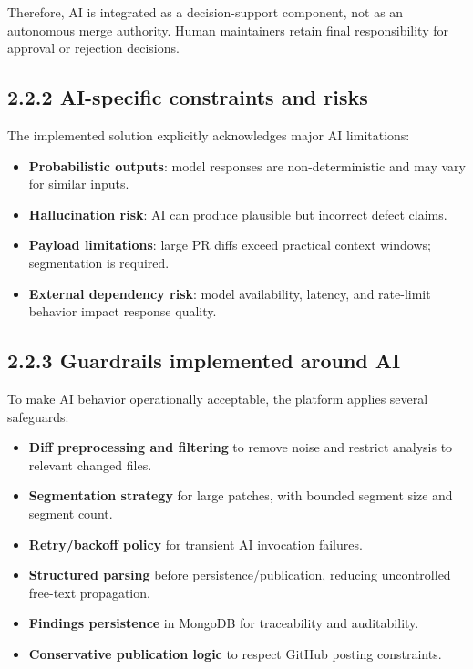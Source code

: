 Therefore, AI is integrated as a decision-support component, not as an autonomous merge authority. Human maintainers retain final responsibility for approval or rejection decisions.

\subsection{2.2.2 AI-specific constraints and risks}

The implemented solution explicitly acknowledges major AI limitations:
\begin{itemize}
    \item \textbf{Probabilistic outputs}: model responses are non-deterministic and may vary for similar inputs.
    \item \textbf{Hallucination risk}: AI can produce plausible but incorrect defect claims.
    \item \textbf{Payload limitations}: large PR diffs exceed practical context windows; segmentation is required.
    \item \textbf{External dependency risk}: model availability, latency, and rate-limit behavior impact response quality.
\end{itemize}

\subsection{2.2.3 Guardrails implemented around AI}

To make AI behavior operationally acceptable, the platform applies several safeguards:
\begin{itemize}
    \item \textbf{Diff preprocessing and filtering} to remove noise and restrict analysis to relevant changed files.
    \item \textbf{Segmentation strategy} for large patches, with bounded segment size and segment count.
    \item \textbf{Retry/backoff policy} for transient AI invocation failures.
    \item \textbf{Structured parsing} before persistence/publication, reducing uncontrolled free-text propagation.
    \item \textbf{Findings persistence} in MongoDB for traceability and auditability.
    \item \textbf{Conservative publication logic} to respect GitHub posting constraints.
\end{itemize}

